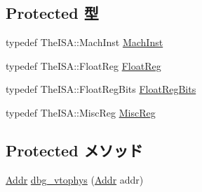 \subsection*{Protected 型}
\begin{DoxyCompactItemize}
\item 
typedef TheISA::MachInst \hyperlink{classCheckerCPU_a4617f528417b8f55f809ae0988284c9b}{MachInst}
\item 
typedef TheISA::FloatReg \hyperlink{classCheckerCPU_a75484259f1855aabc8d74c6eb1cfe186}{FloatReg}
\item 
typedef TheISA::FloatRegBits \hyperlink{classCheckerCPU_aab5eeae86499f9bfe15ef79360eccc64}{FloatRegBits}
\item 
typedef TheISA::MiscReg \hyperlink{classCheckerCPU_aaf5f073a387db0556d1db4bcc45428bc}{MiscReg}
\end{DoxyCompactItemize}
\subsection*{Protected メソッド}
\begin{DoxyCompactItemize}
\item 
\hyperlink{base_2types_8hh_af1bb03d6a4ee096394a6749f0a169232}{Addr} \hyperlink{classCheckerCPU_a7e2d118d430dcbebd896ba39811ef03b}{dbg\_\-vtophys} (\hyperlink{base_2types_8hh_af1bb03d6a4ee096394a6749f0a169232}{Addr} addr)
\end{DoxyCompactItemize}
